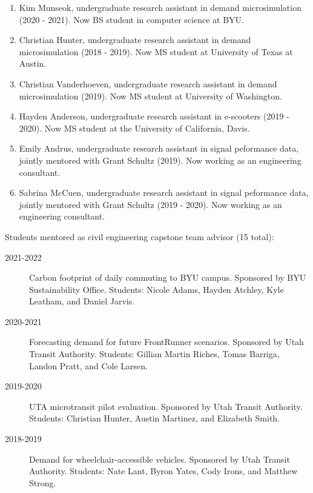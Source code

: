 \documentclass[margin,line]{res}
\newcounter{enuminitialize}
\newenvironment{myenum}[1][]
{%
 \setcounter{enuminitialize}{#1}
 \addtocounter{enuminitialize}{2}
 \begin{enumerate}[left= 4pt, itemsep=12pt, start=\value{enuminitialize}, label=\arabic*\addtocounter{enumi}{-2}]
}
{%
 \end{enumerate}
}
\newcommand{\secfont}{\scshape }
\newcommand{\acc}{\scshape }
\begin{document}
\begin{resume}
\begin{myenum}[20]
  \item Kim Munseok, undergraduate research assistant in demand microsimulation (2020 - 2021). Now BS student in computer science at BYU.
  \item Christian Hunter, undergraduate research assistant in demand microsimulation (2018 - 2019). Now MS student at University  of Texas at Austin.
  \item Christian Vanderhoeven, undergraduate research assistant in demand microsimulation (2019). Now MS student at University of Washington.
  \item Hayden Anderson, undergraduate research assistant in e-scooters (2019 - 2020). Now MS student at the University of California, Davis.
  \item Emily Andrus, undergraduate research assistant in signal peformance data, jointly mentored with Grant Schultz (2019). Now working as an engineering consultant.
  \item Sabrina McCuen, undergraduate research assistant in signal peformance data, jointly mentored with Grant Schultz (2019 - 2020). Now working as an engineering consultant.
\end{myenum}


Students mentored as civil engineering capstone team advisor (15 total):
\vspace{0.2cm}
\begin{description}
  \item[2021-2022] Carbon footprint of daily commuting to BYU campus. Sponsored by BYU Sustainability Office. Students: Nicole Adams, Hayden Atchley, Kyle Leatham, and Daniel Jarvis.
  \item[2020-2021] Forecasting demand for future FrontRunner scenarios. Sponsored by Utah Transit Authority. Students: Gillian Martin Riches, Tomas Barriga, Landon Pratt, and Cole Larsen.
  \item[2019-2020] UTA microtransit pilot evaluation. Sponsored by Utah Transit Authority. Students: Christian Hunter, Austin Martinez, and Elizabeth Smith.
  \item[2018-2019] Demand for wheelchair-accessible vehicles. Sponsored by Utah Transit Authority. Students: Nate Lant, Byron Yates, Cody Irons, and Matthew Strong.
\end{description}


%




\end{resume}
\end{document}
